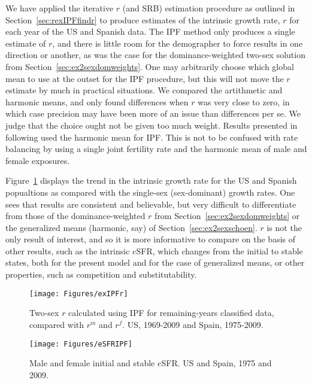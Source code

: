 \FloatBarrier

We have applied the iterative $r$ (and SRB) estimation procedure as outlined in
Section~\ref{sec:rexIPFfindr} to produce estimates of the intrinsic growth rate,
$r$ for each year of the US and Spanish data. The IPF method only produces a
single estimate of $r$, and there is little room for the demographer to force
results in one direction or another, as was the case for the dominance-weighted
two-sex solution from Section~\ref{sec:ex2sexdomweights}. One may
arbitrarily choose which global mean to use at the outset for the IPF procedure,
but this will not move the $r$ estimate by much in practical situations. We
compared the artithmetic and harmonic means, and only found differences when $r$
was very close to zero, in which case precision may have been more of an issue
than differences per se. We judge that the choice ought not be given too much
weight. Results presented in following used the harmonic mean for IPF. This is
not to be confused with rate balancing by using a single joint fertility rate
and the harmonic mean of male and female exposures.

Figure~\ref{fig:exIPFr} displays the trend in the intrinsic growth rate for
the US and Spanish popualtions as compared with the single-sex (sex-dominant)
growth rates. One sees that results are consistent and believable, but very
difficult to differentiate from those of the dominance-weighted $r$ from
Section~\ref{sec:ex2sexdomweights} or the generalized means (harmonic, say) of
Section~\ref{sec:ex2sexschoen}. $r$ is not the only result of interest, and so
it is more informative to compare on the basis of other results, such as the
intrinsic $e$SFR, which changes from the initial to stable states, both for the present model and
for the case of generalized means, or other properties, such as competition and
substitutability.

 \begin{figure}[ht!]
        \centering  
          \caption{Two-sex $r$ calculated using IPF for remaining-years
          classified data, compared with $r^m$ and $r^f$. US, 1969-2009 and
          Spain, 1975-2009.}
           \texttt{[image: Figures/exIPFr]}
          \label{fig:exIPFr}
\end{figure}


\begin{figure}[ht!]
        \centering  
          \caption{Male and female initial and stable $e$SFR. US and
          Spain, 1975 and 2009.}
           \texttt{[image: Figures/eSFRIPF]}
          \label{fig:eSFRIPF}
\end{figure}

\FloatBarrier